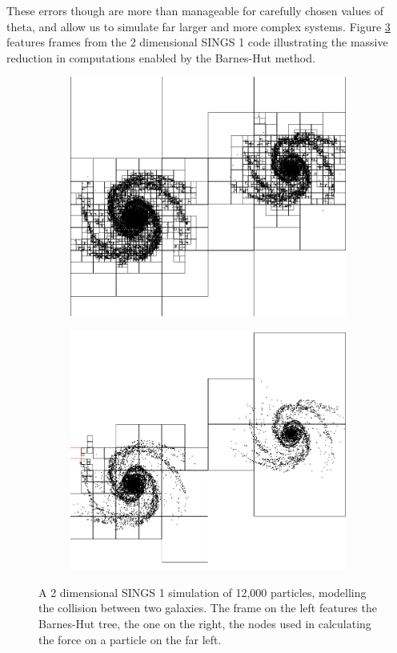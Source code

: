 \documentclass[12pt, twoside, letterpaper]{article}
\begin{document}
These errors though are more than manageable for carefully chosen values of theta, and allow us to simulate far larger and more complex systems. Figure \ref{fig:sings1bh} features frames from the 2 dimensional SINGS 1 code illustrating the massive reduction in computations enabled by the Barnes-Hut method.
\begin{figure}
\centering
\begin{subfigure}[t]{.45\textwidth}
  \centering
  \includegraphics[width=.9\textwidth]{sings1fulltree.png}
  \label{fig:sub1}
\end{subfigure}%
\begin{subfigure}[t]{.5\textwidth}
  \centering
  \includegraphics[width=.9\textwidth]{sings1sometree.png}
  \label{fig:sub2}
\end{subfigure}
\caption{A 2 dimensional SINGS 1 simulation of 12,000 particles, modelling the collision between two galaxies. The frame on the left features the Barnes-Hut tree, the one on the right, the nodes used in calculating the force on a particle on the far left.}
\label{fig:sings1bh}
\end{figure}
\end{document}
